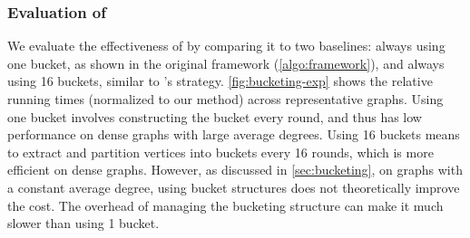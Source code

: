 \subsubsection{Evaluation of \HBS} \label{para:exp_bucketing}



We evaluate the effectiveness of \HBS{} by comparing it to two baselines: 
always using one bucket, as shown in the original framework (\cref{algo:framework}), 
and always using 16 buckets, similar to \Julienne{}'s strategy.
\cref{fig:bucketing-exp} shows the relative running times (normalized to our method) across representative graphs.
Using one bucket involves constructing the bucket every round, 
and thus has low performance on dense graphs with large average degrees.
Using 16 buckets means to extract and partition vertices into buckets every 16 rounds, 
which is more efficient on dense graphs. 
However, as discussed in \cref{sec:bucketing}, on graphs with a constant average degree, 
using bucket structures does not theoretically improve the cost.
The overhead of managing the bucketing structure can make it much slower than using 1 bucket. 

